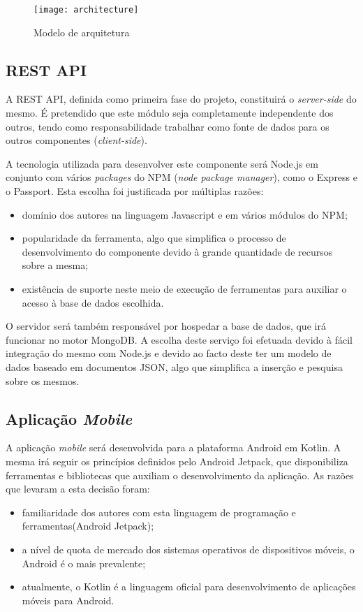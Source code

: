 \begin{figure}[h]
	\centering
	\texttt{[image: architecture]}
	\caption{Modelo de arquitetura}
\end{figure}


\subsection{REST API}
A REST API, definida como primeira fase do projeto, constituirá o \textit{server-side} do mesmo. É pretendido que este módulo seja completamente independente dos outros, tendo como responsabilidade trabalhar como fonte de dados para os outros componentes (\textit{client-side}). \par \medskip 

A tecnologia utilizada para desenvolver este componente será Node.js em conjunto com vários \textit{packages} do NPM (\textit{node package manager}), como o Express e o Passport. Esta escolha foi justificada por múltiplas razões:
\begin{itemize}
	\item domínio dos autores na linguagem Javascript e em vários módulos do NPM;
	\item popularidade da ferramenta, algo que simplifica o processo de desenvolvimento do componente devido à grande quantidade de recursos sobre a mesma;
	\item existência de suporte neste meio de execução de ferramentas para auxiliar o acesso à base de dados escolhida.
\end{itemize}
\par \medskip

O servidor será também responsável por hospedar a base de dados, que irá funcionar no motor MongoDB. A escolha deste serviço foi efetuada devido à fácil integração do mesmo com Node.js e devido ao facto deste ter um modelo de dados baseado em documentos JSON, algo que simplifica a inserção e pesquisa sobre os mesmos.
\par \medskip

\subsection{Aplicação \textit{Mobile}}
A aplicação \textit{mobile} será desenvolvida para a plataforma Android em Kotlin. A mesma irá seguir os princípios definidos pelo Android Jetpack, que disponibiliza ferramentas e bibliotecas que auxiliam o desenvolvimento da aplicação. As razões que levaram a esta decisão foram:
\begin{itemize}
	\item familiaridade dos autores com esta linguagem de programação e ferramentas(Android Jetpack);
	\item a nível de quota de mercado dos sistemas operativos de dispositivos móveis, o Android é o mais prevalente;
	\item atualmente, o Kotlin é a linguagem oficial para desenvolvimento de aplicações móveis para Android.
\end{itemize}

